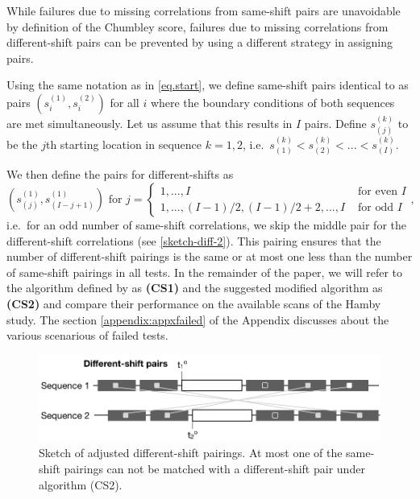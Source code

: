 \documentclass[12pt]{article}
\begin{document}
While failures due to missing correlations from same-shift pairs are
unavoidable by definition of the Chumbley score, failures due to missing
correlations from different-shift pairs can be prevented by using a
different strategy in assigning pairs.

Using the same notation as in \autoref{eq.start}, we define same-shift
pairs identical to \citet{hadler} as pairs \((s_i^{(1)}, s_i^{(2)})\)
for all \(i\) where the boundary conditions of both sequences are met
simultaneously. Let us assume that this results in \(I\) pairs. Define
\(s_{(j)}^{(k)}\) to be the \(j\)th starting location in sequence
\(k = 1, 2\),
i.e.~\(s_{(1)}^{(k)} < s_{(2)}^{(k)} < ... < s_{(I)}^{(k)}\).

We then define the pairs for different-shifts as
\begin{equation}\label{eq.diff2}
\left(s_{(j)}^{(1)}, s_{(I-j+1)}^{(1)} \right) \text{ for } j = 
\begin{cases}
1, ..., I & \text{ for even } I \\
1, ..., (I-1)/2, (I-1)/2 + 2, ..., I & \text{ for odd } I
\end{cases},
\end{equation} i.e.~for an odd number of same-shift correlations, we
skip the middle pair for the different-shift correlations (see
\autoref{sketch-diff-2}). This pairing ensures that the number of
different-shift pairings is the same or at most one less than the number
of same-shift pairings in all tests. In the remainder of the paper, we
will refer to the algorithm defined by \citet{hadler} as \textbf{(CS1)}
and the suggested modified algorithm as \textbf{(CS2)} and compare their
performance on the available scans of the Hamby study. The section
\ref{appendix:appxfailed} of the Appendix discusses about the various
scenarious of failed tests.

\begin{figure}[hbtp]
\centering
\includegraphics[width=.7\textwidth]{images/sketch-diff-2.png}
\caption{\label{sketch-diff-2}Sketch of adjusted different-shift pairings. At most one of the same-shift pairings can not be matched with a different-shift pair under algorithm (CS2). }
\end{figure}
\end{document}
